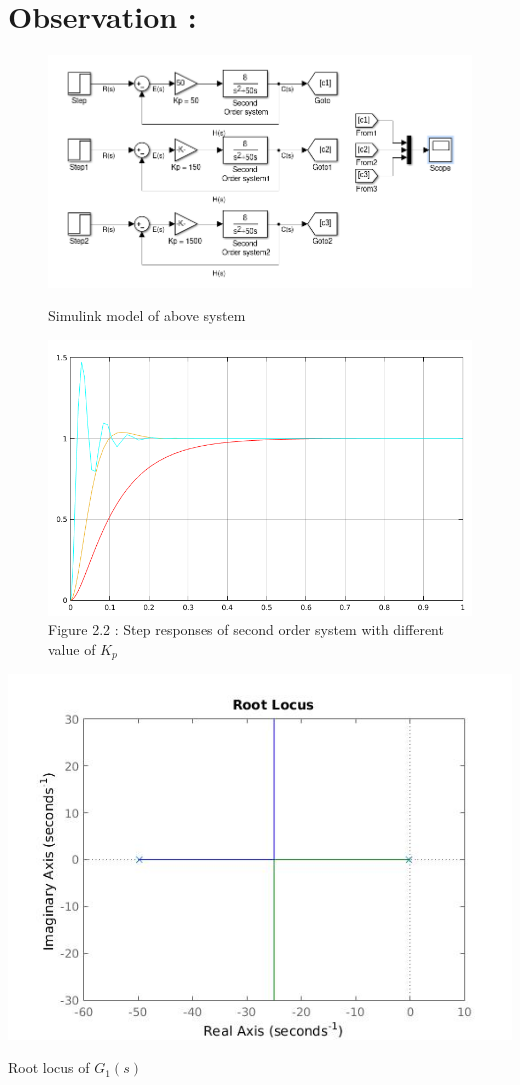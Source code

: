 \message{ !name(lab1.tex)}\documentclass[a4paper,12pt,openany]{book}
\begin{document}
\section{Observation :}
\begin{figure}[ht!]
  \centering
\includegraphics[width = 165mm, scale = 0.85]{lab2part11.png}
   \caption{Simulink model of above system}
\includegraphics[width = 165mm, scale = 0.85]{lab2part12.png}
   \caption{Figure 2.2 : Step responses of second order system with different
     value of $K_p$}
 \end{figure}
\begin{minipage}{0.60\linewidth}
  \includegraphics[width = \linewidth]{rlocus.jpg}
  \begin{center}
    \caption{Root locus of $G_1(s)$}
    \end{center}
    \end{minipage} \hfil
\end{document}
